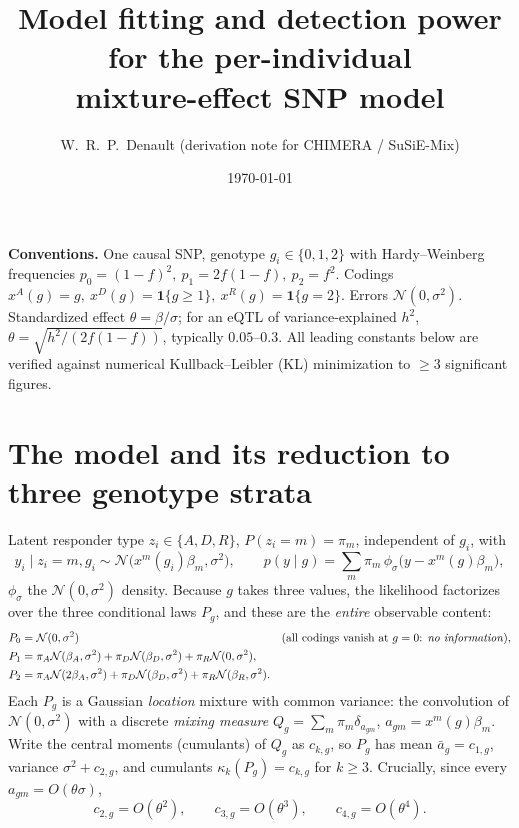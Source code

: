 \documentclass[11pt]{article}
\title{Model fitting and detection power for the per-individual\\
mixture-effect SNP model}
\author{W.\ R.\ P.\ Denault \quad (derivation note for CHIMERA / SuSiE-Mix)}
\date{\today}
\newcommand{\N}{\mathcal{N}}
\begin{document}
\maketitle

\noindent\textbf{Conventions.} One causal SNP, genotype $g_i\in\{0,1,2\}$ with
Hardy--Weinberg frequencies $p_0=(1-f)^2,\ p_1=2f(1-f),\ p_2=f^2$. Codings
$x^A(g)=g,\ x^D(g)=\mathbf 1\{g\ge1\},\ x^R(g)=\mathbf 1\{g=2\}$. Errors
$\N(0,\sigma^2)$. Standardized effect $\theta=\beta/\sigma$; for an eQTL of
variance-explained $h^2$, $\theta=\sqrt{h^2/(2f(1-f))}$, typically $0.05$--$0.3$.
All leading constants below are verified against numerical
Kullback--Leibler (KL) minimization to $\ge 3$ significant figures.

\section{The model and its reduction to three genotype strata}
Latent responder type $z_i\in\{A,D,R\}$, $P(z_i=m)=\pi_m$, independent of $g_i$,
with
\begin{equation}
y_i\mid z_i{=}m,g_i\sim \N\!\big(x^m(g_i)\beta_m,\sigma^2\big),\qquad
p(y\mid g)=\sum_{m}\pi_m\,\phi_\sigma\!\big(y-x^m(g)\beta_m\big),
\label{eq:model}
\end{equation}
$\phi_\sigma$ the $\N(0,\sigma^2)$ density. Because $g$ takes three values, the
likelihood factorizes over the three conditional laws $P_g$, and these are the
\emph{entire} observable content:
\begin{align*}
P_0&=\N(0,\sigma^2) &&\text{(all codings vanish at $g=0$: \emph{no information})},\\
P_1&=\pi_A\N(\beta_A,\sigma^2)+\pi_D\N(\beta_D,\sigma^2)+\pi_R\N(0,\sigma^2),\\
P_2&=\pi_A\N(2\beta_A,\sigma^2)+\pi_D\N(\beta_D,\sigma^2)+\pi_R\N(\beta_R,\sigma^2).
\end{align*}
Each $P_g$ is a Gaussian \emph{location} mixture with common variance: the
convolution of $\N(0,\sigma^2)$ with a discrete \emph{mixing measure}
$Q_g=\sum_m\pi_m\delta_{a_{gm}}$, $a_{gm}=x^m(g)\beta_m$. Write the central
moments (cumulants) of $Q_g$ as $c_{k,g}$, so $P_g$ has mean $\bar a_g=c_{1,g}$,
variance $\sigma^2+c_{2,g}$, and cumulants $\kappa_{k}(P_g)=c_{k,g}$ for $k\ge3$.
Crucially, since every $a_{gm}=O(\theta\sigma)$,
\begin{equation}
c_{2,g}=O(\theta^2),\qquad c_{3,g}=O(\theta^3),\qquad c_{4,g}=O(\theta^4).
\label{eq:cumorders}
\end{equation}
\end{document}
